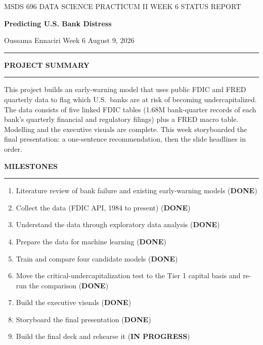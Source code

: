 \documentclass[11pt,letterpaper]{article}
\newcommand{\sectionhead}[1]{%
  \needspace{4\baselineskip}\vspace{4pt}%
  {\sffamily\bfseries\fontsize{9.5}{12}\selectfont\color{navy}\MakeUppercase{#1}}\par
  \vspace{-9pt}\textcolor{hairline}{\rule{\textwidth}{0.5pt}}\par\vspace{0pt}}
\newcommand{\answer}[1]{#1\par\vspace{3pt}}
\begin{document}
\vspace*{-14pt}
{\sffamily\fontsize{8.5}{11}\selectfont\color{midgray}MSDS 696 DATA SCIENCE PRACTICUM II \quad\textbar\quad WEEK 6 STATUS REPORT}\par\vspace{10pt}
{\sffamily\bfseries\fontsize{21}{25}\selectfont\color{navy}Predicting U.S. Bank Distress}\par\vspace{9pt}
{\sffamily\fontsize{9}{12}\selectfont Oussama Ennaciri \quad\textbar\quad Week 6 \quad\textbar\quad August 9, 2026}\par\vspace{5pt}
\textcolor{navy}{\rule{\textwidth}{1.2pt}}

\sectionhead{Project summary}
\answer{This project builds an early-warning model that uses public FDIC and FRED quarterly data to flag which U.S.\ banks are at risk of becoming undercapitalized. The data consists of five linked FDIC tables (1.68M bank-quarter records of each bank's quarterly financial and regulatory filings) plus a FRED macro table. Modelling and the executive visuals are complete. This week storyboarded the final presentation: a one-sentence recommendation, then the slide headlines in order.}

\sectionhead{Milestones}
\answer{\begin{enumerate}[topsep=1pt,itemsep=1pt,leftmargin=16pt,label=\textcolor{navy}{\bfseries\arabic*.}]
  \item Literature review of bank failure and existing early-warning models (\textbf{DONE})
  \item Collect the data (FDIC API, 1984 to present) (\textbf{DONE})
  \item Understand the data through exploratory data analysis (\textbf{DONE})
  \item Prepare the data for machine learning (\textbf{DONE})
  \item Train and compare four candidate models (\textbf{DONE})
  \item Move the critical-undercapitalization test to the Tier 1 capital basis and re-run the comparison (\textbf{DONE})
  \item Build the executive visuals (\textbf{DONE})
  \item Storyboard the final presentation (\textbf{DONE})
  \item Build the final deck and rehearse it (\textbf{IN PROGRESS})
\end{enumerate}}
\end{document}

